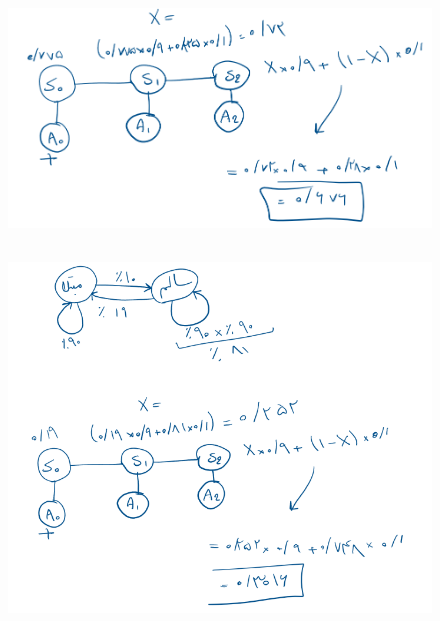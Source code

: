 \documentclass{university}
\begin{document}
\subsection{}
\begin{figure}[H]
    \centering
    \includegraphics[width=\textwidth]{assets/2c.png}
\end{figure}

\subsection{}
\begin{figure}[H]
    \centering
    \includegraphics[width=\textwidth]{assets/2d.png}
\end{figure}

\section{}
\end{document}
